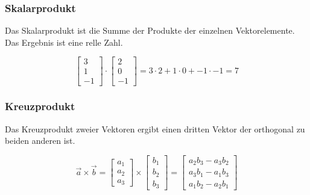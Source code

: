 \subsubsection{Skalarprodukt}

Das Skalarprodukt ist die Summe der Produkte der einzelnen Vektorelemente.
Das Ergebnis ist eine relle Zahl.

\begin{equation}
    \begin{bmatrix}
        3 \\
        1 \\
        -1
    \end{bmatrix} \cdot
    \begin{bmatrix}
        2 \\
        0 \\
        -1
    \end{bmatrix} = 3 \cdot 2 + 1 \cdot 0 + -1 \cdot -1 = 7
\end{equation}

\subsubsection{Kreuzprodukt}

Das Kreuzprodukt zweier Vektoren ergibt einen dritten Vektor der orthogonal
zu beiden anderen ist.

\begin{equation}
    \vec{a} \times \vec{b} =
    \begin{bmatrix}
        a_1 \\
        a_2 \\
        a_3
    \end{bmatrix} \times
    \begin{bmatrix}
        b_1 \\
        b_2 \\
        b_3
    \end{bmatrix} =
    \begin{bmatrix}
        a_2 b_3 - a_3 b_2 \\
        a_3 b_1 - a_1 b_3 \\
        a_1 b_2 - a_2 b_1
    \end{bmatrix}
\end{equation}


